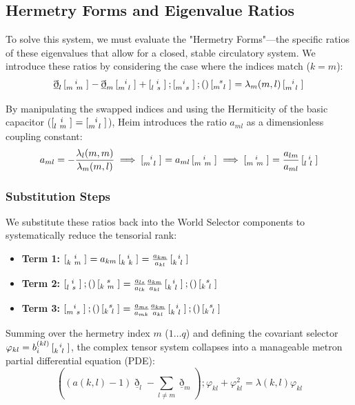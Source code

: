 \documentclass[11pt,a4paper,oneside]{article}
\newcommand{\ethop}{\eth}
\newcommand{\metroncap}[4][]{%
    \left[ \renewcommand{\arraystretch}{0.85} \substack{#2 \\ #3 \ #4} \right]_{#1}%
}
\begin{document}
\subsection{Hermetry Forms and Eigenvalue Ratios}

To solve this system, we must evaluate the "Hermetry Forms"—the specific ratios of these eigenvalues that allow for a closed, stable circulatory system. We introduce these ratios by considering the case where the indices match ($k=m$):
\begin{equation*}
    \underline{\ethop}_l \metroncap{i}{m\ m}{ } - \underline{\ethop}_m \metroncap{i}{m\ l}{ } + \metroncap{i}{l\ s}{ }; \metroncap{i}{m\ s}{ }; () \metroncap{s}{m\ l}{ } = \lambda_m(m, l) \metroncap{i}{m\ l}{ }
\end{equation*}

By manipulating the swapped indices and using the Hermiticity of the basic capacitor ($\metroncap{i}{l\ m}{ } = \metroncap{i}{m\ l}{ }$), Heim introduces the ratio $a_{ml}$ as a dimensionless coupling constant:
\begin{equation*}
    a_{ml} = -\frac{\lambda_l(m, m)}{\lambda_m(m, l)} \implies \metroncap{i}{m\ l}{ } = a_{ml} \metroncap{i}{m\ m}{ } \implies \metroncap{i}{m\ m}{ } = \frac{a_{lm}}{a_{ml}} \metroncap{i}{l\ l}{ }
\end{equation*}

\subsubsection{Substitution Steps}
We substitute these ratios back into the World Selector components to systematically reduce the tensorial rank:
\begin{itemize}
    \item \textbf{Term 1:} $\metroncap{i}{k\ m}{ } = a_{km} \metroncap{i}{k\ k}{ } = \frac{a_{km}}{a_{kl}} \metroncap{i}{k\ l}{ }$
    \item \textbf{Term 2:} $\metroncap{i}{l\ s}{ }; () \metroncap{s}{k\ m}{ } = \frac{a_{ls}}{a_{lk}} \frac{a_{km}}{a_{kl}} \metroncap{i}{k\ l}{ }; () \metroncap{s}{k\ l}{ }$
    \item \textbf{Term 3:} $\metroncap{i}{m\ s}{ }; () \metroncap{s}{k\ l}{ } = \frac{a_{ms}}{a_{mk}} \frac{a_{km}}{a_{kl}} \metroncap{i}{k\ l}{ }; () \metroncap{s}{k\ l}{ }$
\end{itemize}

Summing over the hermetry index $m$ ($1 \dots q$) and defining the covariant selector $\varphi_{kl} = b_i^{(kl)} \metroncap{i}{k\ l}{ }$, the complex tensor system collapses into a manageable metron partial differential equation (PDE):
\begin{equation}
    \left( (a(k, l)-1)\underline{\ethop}_l - \sum_{l \neq m} \underline{\ethop}_m \right); \varphi_{kl} + \varphi_{kl}^2 = \lambda(k, l)\varphi_{kl}
\tag{W3}
\end{equation}
\end{document}
